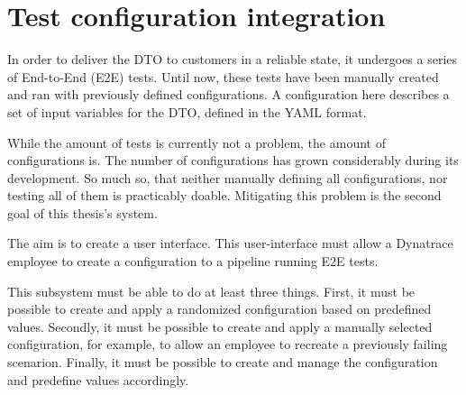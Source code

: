 \section{Test configuration integration}
\label{sec:introduction:test-configuration-integration}

In order to deliver the DTO to customers in a reliable state, it undergoes a series of End-to-End (E2E) tests.
Until now, these tests have been manually created and ran with previously defined configurations.
A configuration here describes a set of input variables for the DTO, defined in the YAML format.

While the amount of tests is currently not a problem, the amount of configurations is.
The number of configurations has grown considerably during its development.
So much so, that neither manually defining all configurations, nor testing all of them is practicably doable.
Mitigating this problem is the second goal of this thesis's system.

The aim is to create a user interface.
This user-interface must allow a Dynatrace employee to create a configuration to a pipeline running E2E tests.

This subsystem must be able to do at least three things.
First, it must be possible to create and apply a randomized configuration based on predefined values.
Secondly, it must be possible to create and apply a manually selected configuration, for example, to allow an employee to recreate a previously failing scenarion.
Finally, it must be possible to create and manage the configuration and predefine values accordingly.





